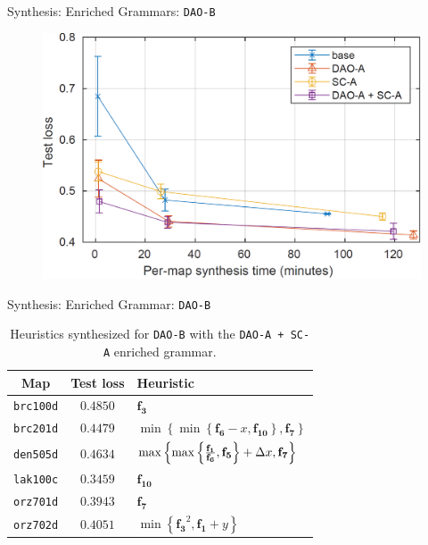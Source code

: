 \documentclass[aspectratio=169,usenames,dvipsnames]{beamer}
\renewcommand{\max}{\operatornamewithlimits{max}\limits}
\numberwithin{equation}{section}
\numberwithin{theorem}{section}
\numberwithin{lem}{section}
\numberwithin{df}{section}
\begin{document}

\begin{frame}{Synthesis: Enriched Grammars: {\tt DAO-B}}

\begin{figure}[H]
	\centering
	\includegraphics[width=0.75\columnwidth]{figs/bblocks_daoB.png}
\end{figure}


\end{frame}


\begin{frame}{Synthesis: Enriched Grammar: {\tt DAO-B}}

\begin{table}[htbp]
	{%
\begin{center}
\begin{tabular}{c|c|l}
			\toprule
			{\bf Map} & {\bf Test loss} & {\bf Heuristic}\\
			\midrule
			{\tt brc100d} & $0.4850$ &
			$\mathbf{f_{3}}$\\
			{\tt brc201d} & $0.4479$ &
			$\min\left\{\min\left\{\mathbf{f_{6}} - x,\mathbf{f_{10}}\right\},\mathbf{f_{7}}\right\}$\\
			{\tt den505d} & $0.4634$ &
			$\max\left\{\max\left\{\frac{\mathbf{f_{1}}}{\mathbf{f_{6}}},\mathbf{f_{5}}\right\} + \Delta x,\mathbf{f_{7}}\right\}$\\
			{\tt lak100c} & $0.3459$ &
			$\mathbf{f_{10}}$\\
			{\tt orz701d} & $0.3943$ &
			$\mathbf{f_{7}}$\\
			{\tt orz702d} & $0.4051$ &
			$\min\left\{\mathbf{f_{3}}^2,\mathbf{f_{1}} + y\right\}$\\
			\bottomrule
	\end{tabular}
\end{center}
}
	\caption{Heuristics synthesized for {\tt DAO-B} with the {\tt DAO-A + SC-A} enriched grammar.}
	\label{tab:h_results_daoB}
\end{table}


\end{frame}
\end{document}

